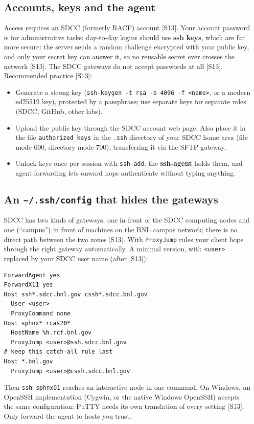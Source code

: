 \documentclass[11pt,letterpaper]{article}
\newcommand{\code}[1]{\texttt{#1}}
\begin{document}
\subsection{Accounts, keys and the agent}
Access requires an SDCC (formerly RACF) account [S13].
Your account password is for administrative tasks; day-to-day logins should use \textbf{ssh keys}, which are far more secure: the server sends a random challenge encrypted with your public key, and only your secret key can answer it, so no reusable secret ever crosses the network [S13].
The SDCC gateways do not accept passwords at all [S13].
Recommended practice [S13]:
\begin{itemize}
\item Generate a strong key (\code{ssh-keygen -t rsa -b 4096 -f <name>}, or a modern ed25519 key), protected by a passphrase; use separate keys for separate roles (SDCC, GitHub, other labs).
\item Upload the public key through the SDCC account web page. Also place it in the file \code{authorized\_keys} in the \code{.ssh} directory of your SDCC home area (file mode 600, directory mode 700), transferring it via the SFTP gateway.
\item Unlock keys once per session with \code{ssh-add}; the \textbf{ssh-agent} holds them, and agent forwarding lets onward hops authenticate without typing anything.
\end{itemize}

\subsection{An \code{\textasciitilde/.ssh/config} that hides the gateways}
SDCC has two kinds of gateways: one in front of the SDCC computing nodes and one (``campus'') in front of machines on the BNL campus network; there is no direct path between the two zones [S13].
With \code{ProxyJump} rules your client hops through the right gateway automatically. A minimal version, with \code{<user>} replaced by your SDCC user name (after [S13]):
{\footnotesize\begin{verbatim}
ForwardAgent yes
ForwardX11 yes
Host ssh*.sdcc.bnl.gov cssh*.sdcc.bnl.gov
  User <user>
  ProxyCommand none
Host sphnx* rcas20*
  HostName %h.rcf.bnl.gov
  ProxyJump <user>@ssh.sdcc.bnl.gov
# keep this catch-all rule last
Host *.bnl.gov
  ProxyJump <user>@cssh.sdcc.bnl.gov
\end{verbatim}}
Then \code{ssh sphnx01} reaches an interactive node in one command. On Windows, an OpenSSH implementation (Cygwin, or the native Windows OpenSSH) accepts the same configuration; PuTTY needs its own translation of every setting [S13].
Only forward the agent to hosts you trust.
\end{document}

